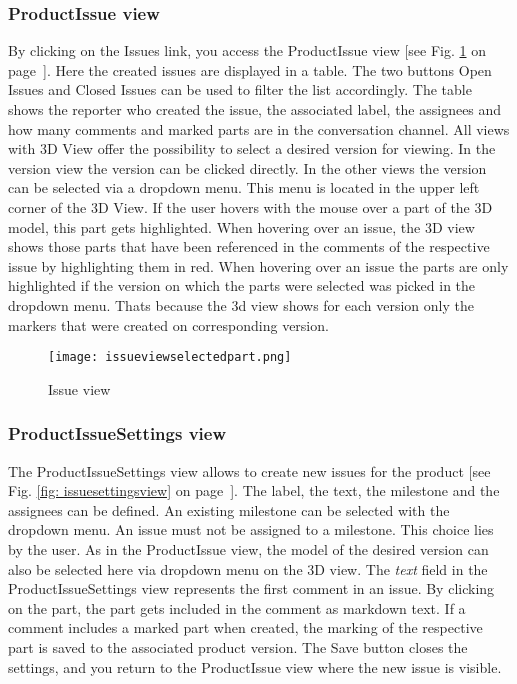     \subsubsection*{ProductIssue view}
    By clicking on the Issues link, you access the ProductIssue view [see Fig. \ref{fig: issueview} on page~\pageref{fig: issueview}]. Here the created issues are displayed in a table. The two buttons Open Issues and Closed Issues can be used to filter the list accordingly. The table shows the reporter who created the issue, the associated label, the assignees and how many comments and marked parts are in the conversation channel. 
    All views with 3D View offer the possibility to select a desired version for viewing. In the version view the version can be clicked directly. In the other views the version can be selected via a dropdown menu. This menu is located in the upper left corner of the 3D View. 
    If the user hovers with the mouse over a part of the 3D model, this part gets highlighted. 
    When hovering over an issue, the 3D view shows those parts that have been referenced in the comments of the respective issue by highlighting them in red.
    When hovering over an issue the parts are only highlighted if the version on which the parts were selected was picked in the dropdown menu. Thats because the 3d view shows for each version only the markers that were created on corresponding version.

    \begin{figure}[h]
        \centering
        \texttt{[image: issueviewselectedpart.png]}
        \caption{Issue view}
        \label{fig: issueview}
    \end{figure}

    \subsubsection*{ProductIssueSettings view}
    The ProductIssueSettings view allows to create new issues for the product [see Fig. \ref{fig: issuesettingsview} on page~\pageref{fig: issuesettingsview}]. The label, the text, the milestone and the assignees can be defined. An existing milestone can be selected with the dropdown menu. An issue must not be assigned to a milestone. This choice lies by the user. 
    As in the ProductIssue view, the model of the desired version can also be selected here via dropdown menu on the 3D view.
    The \textit{text} field in the ProductIssueSettings view represents the first comment in an issue. By clicking on the part, the part gets included in the comment as markdown text. If a comment includes a marked part when created, the marking of the respective part is saved to the associated product version.
    The Save button closes the settings, and you return to the ProductIssue view where the new issue is visible.


